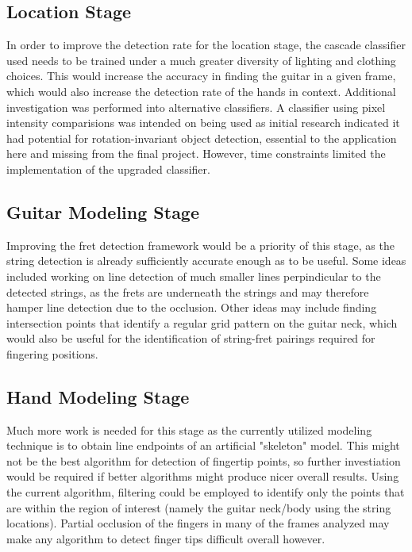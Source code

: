 \subsection{Location Stage}
In order to improve the detection rate for the location stage, the cascade classifier used needs to be
trained under a much greater diversity of lighting and clothing choices. This would increase the accuracy in
finding the guitar in a given frame, which would also increase the detection rate of the hands in context.
Additional investigation was performed into alternative classifiers. A classifier using pixel intensity
comparisions \cite{pico} was intended on being used as initial research indicated it had potential for
rotation-invariant object detection, essential to the application here and missing from the final
project. However, time constraints limited the implementation of the upgraded classifier.

\subsection{Guitar Modeling Stage}
Improving the fret detection framework would be a priority of this stage, as the string detection is already
sufficiently accurate enough as to be useful. Some ideas included working on line detection of much smaller
lines perpindicular to the detected strings, as the frets are underneath the strings and may therefore 
hamper line detection due to the occlusion. Other ideas may include finding intersection points that identify
a regular grid pattern on the guitar neck, which would also be useful for the identification of string-fret
pairings required for fingering positions.

\subsection{Hand Modeling Stage}
Much more work is needed for this stage as the currently utilized modeling technique is to obtain line
endpoints of an artificial "skeleton" model. This might not be the best algorithm for detection of fingertip
points, so further investiation would be required if better algorithms might produce nicer overall results.
Using the current algorithm, filtering could be employed to identify only the points that are within the region
of interest (namely the guitar neck/body using the string locations). Partial occlusion of the fingers in
many of the frames analyzed may make any algorithm to detect finger tips difficult overall however.

